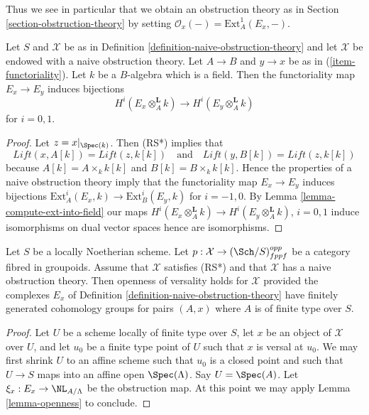 \noindent
Thus we see in particular that we obtain an obstruction theory
as in Section \ref{section-obstruction-theory} by setting
$\mathcal{O}_x( - ) = \text{Ext}^1_A(E_x, -)$.

\begin{lemma}
\label{lemma-naive-obstruction-theory-qis}
Let $S$ and $\mathcal{X}$ be as in
Definition \ref{definition-naive-obstruction-theory}
and let $\mathcal{X}$ be endowed with a naive obstruction theory.
Let $A \to B$ and $y \to x$ be as in (\ref{item-functoriality}).
Let $k$ be a $B$-algebra which is a field. Then the functoriality
map $E_x \to E_y$ induces bijections
$$
H^i(E_x \otimes_A^{\mathbf{L}} k) \to H^i(E_y \otimes_A^{\mathbf{L}} k)
$$
for $i = 0, 1$.
\end{lemma}

\begin{proof}
Let $z = x|_{\Spec(k)}$. Then (RS*) implies that
$$
\textit{Lift}(x, A[k]) = \textit{Lift}(z, k[k])
\quad\text{and}\quad
\textit{Lift}(y, B[k]) = \textit{Lift}(z, k[k])
$$
because $A[k] = A \times_k k[k]$ and $B[k] = B \times_k k[k]$.
Hence the properties of a naive obstruction theory imply that the
functoriality map $E_x \to E_y$ induces bijections
$\text{Ext}^i_A(E_x, k) \to \text{Ext}^i_B(E_y, k)$
for $i = -1, 0$. By Lemma \ref{lemma-compute-ext-into-field} our maps
$H^i(E_x \otimes_A^{\mathbf{L}} k) \to H^i(E_y \otimes_A^{\mathbf{L}} k)$,
$i = 0, 1$ induce isomorphisms on dual vector spaces hence are isomorphisms.
\end{proof}

\begin{lemma}
\label{lemma-naive-obstruction-theory-gives-openness}
Let $S$ be a locally Noetherian scheme. Let
$p : \mathcal{X} \to (\Sch/S)_{fppf}^{opp}$ be a category fibred in groupoids.
Assume that $\mathcal{X}$ satisfies (RS*)
and that $\mathcal{X}$ has a naive obstruction theory.
Then openness of versality holds for $\mathcal{X}$ provided the
complexes $E_x$ of Definition \ref{definition-naive-obstruction-theory}
have finitely generated cohomology groups for pairs $(A, x)$ where
$A$ is of finite type over $S$.
\end{lemma}

\begin{proof}
Let $U$ be a scheme locally of finite type over $S$, let $x$ be an object of
$\mathcal{X}$ over $U$, and let $u_0$ be a finite type point of $U$ such that
$x$ is versal at $u_0$. We may first shrink $U$ to an affine scheme such
that $u_0$ is a closed point and such that $U \to S$ maps into an affine
open $\Spec(\Lambda)$. Say $U = \Spec(A)$. Let
$\xi_x : E_x \to \NL_{A/\Lambda}$ be the obstruction map.
At this point we may apply Lemma \ref{lemma-openness} to conclude.
\end{proof}









